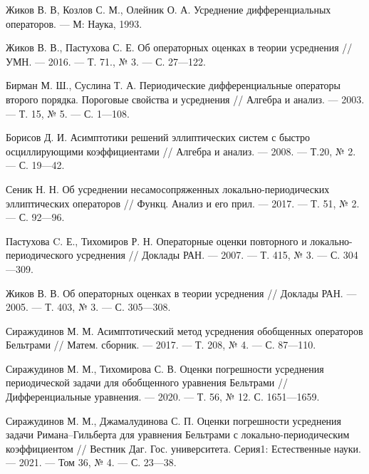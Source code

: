 \begin{thebibliography}{99}
Жиков В. В, Козлов С. М., Олейник О. А. Усреднение дифференциальных операторов. --- М: Наука, 1993.

 


Жиков В. В., Пастухова С. Е. Об операторных оценках в теории усреднения // УМН. --- 2016. --- Т. 71., № 3. --- С. 27---122.

 


Бирман М. Ш., Суслина Т. А. Периодические дифференциальные операторы второго порядка. Пороговые свойства  и усреднения // Алгебра  и  анализ. --- 2003. --- Т. 15, № 5. --- С. 1---108.

 


Борисов Д. И. Асимптотики решений эллиптических систем с быстро осциллирующими коэффициентами // Алгебра и анализ. --- 2008. --- Т.20, № 2. --- С. 19---42.

 


Сеник Н. Н. Об усреднении несамосопряженных локально-периодических эллиптических операторов // Функц. Анализ и его прил. --- 2017. --- Т. 51, № 2. --- С. 92---96.

 


Пастухова C. Е., Тихомиров Р. Н. Операторные оценки повторного  и локально-периодического  усреднения // Доклады РАН. --- 2007. --- Т. 415, № 3. ---  С. 304---309.

 


Жиков В. В. Об операторных оценках в теории усреднения // Доклады РАН. --- 2005. --- Т. 403, № 3. --- С. 305---308.

 


Сиражудинов М. М. Асимптотический метод усреднения обобщенных  операторов Бельтрами // Матем. сборник. --- 2017. --- Т. 208, № 4. --- С. 87---110.

 


Сиражудинов М. М., Тихомирова С. В. Оценки погрешности усреднения периодической задачи для обобщенного уравнения Бельтрами // Дифференциальные уравнения. --- 2020. --- Т. 56, № 12.  С. 1651---1659.

 


Сиражудинов М. М., Джамалудинова С. П. Оценки погрешности усреднения задачи Римана–Гильберта для уравнения Бельтрами с локально-периодическим коэффициентом //  Вестник Даг. Гос. университета. Серия1: Естественные науки. --- 2021. --- Том 36, № 4. --- С. 23---38.

 



\end{thebibliography}
